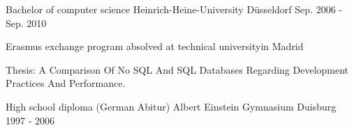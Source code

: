 

\begin{cventries}

  \cventry
    {Bachelor of computer science} %
    {Heinrich-Heine-University} %
    {Düsseldorf} %
    {Sep. 2006 - Sep. 2010} %
  \item Erasmus exchange program absolved at technical universityin Madrid
  \item Thesis: A Comparison Of No SQL And SQL Databases Regarding Development Practices And Performance.


  \cventry
    {High school diploma (German Abitur)} %
    {Albert Einstein Gymnasium} %
    {Duisburg} %
    {1997 - 2006} %
    {}

\end{cventries}
